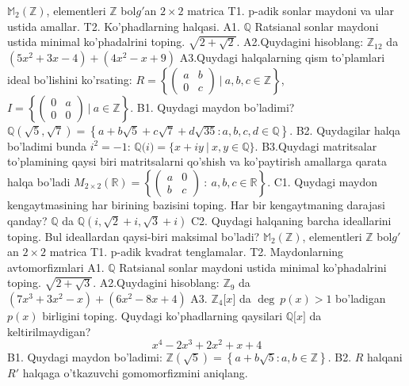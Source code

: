 \(\mathbb{M}_{2}\left( \mathbb{Z} \right)\), elementleri \(\mathbb{Z}\) bol\(g'\)an \(2 \times 2\) matrica
T1. p-adik sonlar maydoni va ular ustida amallar.
T2. Ko'phadlarning halqasi.
A1. \(\mathbb{Q}\) Ratsianal sonlar maydoni ustida minimal ko'phadalrini toping.
\(\sqrt{2 + \sqrt{2}}\).
A2.Quydagini hisoblang:
\(\mathbb{Z}_{12}\) da \(\left( 5x^{2} + 3x - 4 \right) + \left( 4x^{2} - x + 9 \right)\)
A3.Quydagi halqalarning qism to'plamlari ideal bo'lishini ko'rsating: \(R = \left\{ \begin{pmatrix}
a & b \\
0 & c
\end{pmatrix}\ |\ a,b,c \in \mathbb{Z} \right\}\), \(I = \left\{ \begin{pmatrix}
0 & a \\
0 & 0
\end{pmatrix}\ |\ a \in \mathbb{Z} \right\}\).
B1. Quydagi maydon bo'ladimi?
\(\mathbb{Q}\left( \sqrt{5},\sqrt{7} \right) = \left\{ a + b\sqrt{5} + c\sqrt{7} + d\sqrt{35}:a,b,c,d \in \mathbb{Q} \right\}\).
B2. Quydagilar halqa bo'ladimi bunda \(i^{2} = - 1\):
\(\mathbb{Q(}i) = \{ x + iy\ |\ x,y \in \mathbb{Q\}}\).
B3.Quydagi matritsalar to'plamining qaysi biri matritsalarni qo'shish va ko'paytirish amallarga qarata halqa bo'ladi
\(M_{2 \times 2}\mathbb{(R) =}\left\{ \begin{pmatrix}
a & 0 \\
b & c
\end{pmatrix}\ :\ a,b,c \in \mathbb{R} \right\}\).
C1. Quydagi maydon kengaytmasining har birining bazisini toping. Har bir kengaytmaning darajasi qanday?
\(\mathbb{Q}\) da \(\mathbb{Q}\left( i,\sqrt{2} + i,\sqrt{3} + i \right)\)
C2. Quydagi halqaning barcha ideallarini toping. Bul ideallardan qaysi-biri maksimal bo'ladi?
\(\mathbb{M}_{2}\left( \mathbb{Z} \right)\), elementleri \(\mathbb{Z}\) bol\(g'\)an \(2 \times 2\) matrica
T1. p-adik kvadrat tenglamalar.
T2. Maydonlarning avtomorfizmlari
A1. \(\mathbb{Q}\) Ratsianal sonlar maydoni ustida minimal ko'phadalrini toping.
\(\sqrt{2 + \sqrt{3}}\).
A2.Quydagini hisoblang:
\(\mathbb{Z}_{9}\) da \(\left( 7x^{3} + 3x^{2} - x \right) + \left( 6x^{2} - 8x + 4 \right)\)
A3. \(\mathbb{Z}_{4}\lbrack x\rbrack\) da \(\deg\ p(x) > 1\) bo'ladigan \(p(x)\) birligini toping. Quydagi ko'phadlarning qaysilari \(\mathbb{Q\lbrack}x\rbrack\) da keltirilmaydigan?
\[x^{4} - 2x^{3} + 2x^{2} + x + 4\]
B1. Quydagi maydon bo'ladimi:
\(\mathbb{Z}\left( \sqrt{5} \right) = \left\{ a + b\sqrt{5}:a,b \in \mathbb{Z} \right\}\).
B2. \(R\) halqani \(R'\) halqaga o'tkazuvchi gomomorfizmini aniqlang.

